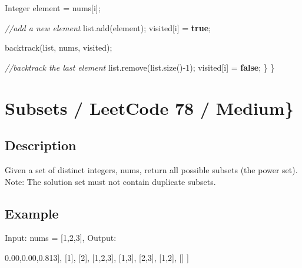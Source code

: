 \documentclass[]{book}
\newenvironment{Shaded}{\begin{snugshade}}{\end{snugshade}}
\newcommand{\BuiltInTok}[1]{#1}
\newcommand{\CommentTok}[1]{\textcolor[rgb]{0.56,0.35,0.01}{\textit{#1}}}
\newcommand{\DecValTok}[1]{\textcolor[rgb]{0.00,0.00,0.81}{#1}}
\newcommand{\FunctionTok}[1]{\textcolor[rgb]{0.00,0.00,0.00}{#1}}
\newcommand{\KeywordTok}[1]{\textcolor[rgb]{0.13,0.29,0.53}{\textbf{#1}}}
\newcommand{\NormalTok}[1]{#1}
\begin{document}
\begin{Shaded}
\begin{Highlighting}[]
        \BuiltInTok{Integer}\NormalTok{ element = nums[i];}

        \CommentTok{//add a new element}
\NormalTok{        list.}\FunctionTok{add}\NormalTok{(element);}
\NormalTok{        visited[i] = }\KeywordTok{true}\NormalTok{;}

        \FunctionTok{backtrack}\NormalTok{(list, nums, visited);}

        \CommentTok{//backtrack the last element}
\NormalTok{        list.}\FunctionTok{remove}\NormalTok{(list.}\FunctionTok{size}\NormalTok{()-}\DecValTok{1}\NormalTok{);}
\NormalTok{        visited[i] = }\KeywordTok{false}\NormalTok{;}
\NormalTok{    \}}
\NormalTok{\}}
\end{Highlighting}
\end{Shaded}

\hypertarget{subsets-leetcode-78-medium}{%
\section{Subsets / LeetCode 78 / Medium\}}\label{subsets-leetcode-78-medium}}

\hypertarget{description-15}{%
\subsection{Description}\label{description-15}}

Given a set of distinct integers, nums, return all possible subsets (the power set).
Note: The solution set must not contain duplicate subsets.

\hypertarget{example-14}{%
\subsection{Example}\label{example-14}}

Input: nums = {[}1,2,3{]}, Output:

\begin{Shaded}
\begin{Highlighting}[]
\NormalTok{[}
\NormalTok{    [}\DecValTok{3}\NormalTok{],}
\NormalTok{    [}\DecValTok{1}\NormalTok{],}
\NormalTok{    [}\DecValTok{2}\NormalTok{],}
\NormalTok{    [}\DecValTok{1}\NormalTok{,}\DecValTok{2}\NormalTok{,}\DecValTok{3}\NormalTok{],}
\NormalTok{    [}\DecValTok{1}\NormalTok{,}\DecValTok{3}\NormalTok{],}
\NormalTok{    [}\DecValTok{2}\NormalTok{,}\DecValTok{3}\NormalTok{],}
\NormalTok{    [}\DecValTok{1}\NormalTok{,}\DecValTok{2}\NormalTok{],}
\NormalTok{    []}
\NormalTok{]}
\end{Highlighting}
\end{Shaded}
\end{document}
